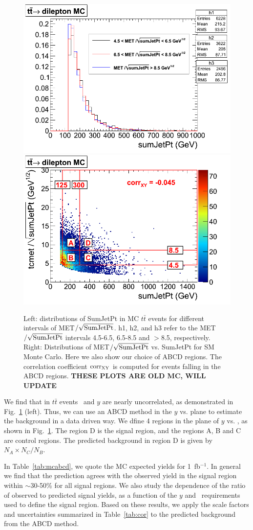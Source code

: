 \begin{figure}[hbt]
\begin{center}
\includegraphics[width=0.48\linewidth]{uncor.png}
\includegraphics[width=0.48\linewidth]{ttdil_uncor_38X.png}
\caption{\label{fig:uncor}\protect 
Left: distributions of SumJetPt 
in MC $t\bar{t}$ events for different intervals of 
MET$/\sqrt{\rm SumJetPt}$. h1, h2, and h3 refer to the MET$/\sqrt{\rm SumJetPt}$
intervals 4.5-6.5, 6.5-8.5 and $>$8.5, respectively. Right: 
Distributions of MET$/\sqrt{\rm SumJetPt}$ vs. 
SumJetPt for SM Monte Carlo.  Here we also show our choice of ABCD regions. The correlation coefficient
${\rm corr_{XY}}$ is computed for events falling in the ABCD regions.
{\bf THESE PLOTS ARE OLD MC, WILL UPDATE}
}
\end{center}
\end{figure}

We find that in $t\bar{t}$ events \Ht\ and 
$y$ are nearly uncorrelated, 
as demonstrated in Fig.~\ref{fig:uncor} (left).
Thus, we can use an ABCD method in the $y$ vs. \Ht
plane to estimate the background in a data driven way. We dfine 4 regions in the 
plane of $y$ vs. \Ht, as shown in Fig.~\ref{fig:uncor}.
The region D is the signal region, and the regions A, B and C are control regions.
The predicted background in region D is given by $N_A \times N_C / N_B$.

In Table~\ref{tab:mcabcd}, we quote the MC expected yields for 1~fb$^{-1}$. In
general we find that the prediction agrees with the observed yield in the signal region within
$\sim$30-50\% for all signal regions. We also study the dependence of the ratio
of observed to predicted signal yields, as a function of the $y$ and \Ht\
requirements used to define the signal region.
Based on these results, we apply the
scale factors and uncertainties summarized in Table~\ref{tab:cor} to the
predicted background from the ABCD method.


